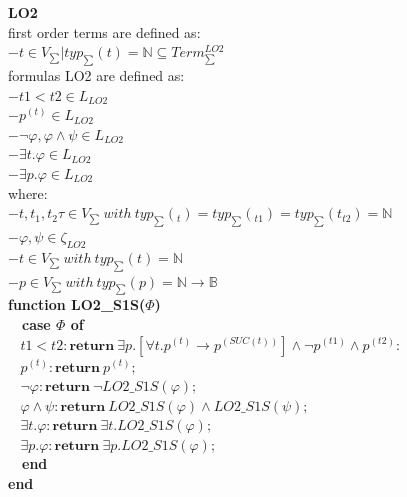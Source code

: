 \documentclass{article}
\begin{document}
\begin{multicols}{4}
\textbf{LO2} \\
first order terms are defined as: \\
$-{\textit{t} \in V_{\sum} | typ_{\sum}(\textit{t}) = \mathbb{N}} \subseteq Term _{\sum}^{LO2} $ \\
formulas LO2 are defined as: \\
$-t1 < t2 \in L_{LO2} $ \\
$-p^{(t)} \in L_{LO2}$ \\
$-\neg\varphi, \varphi \wedge \psi \in L_{LO2}$ \\
$-\exists t. \varphi \in L_{LO2} $ \\
$-\exists p. \varphi \in L_{LO2} $ \\
where: \\
$-t, t_{1}, t_{2}\tau \in V_{\sum} \ with \ typ_{\sum}(_{t}) = typ_{\sum}(_{t1}) = typ_{\sum}(t_{t2}) = \mathbb{N} $ \\
$-\varphi, \psi \in \zeta_{LO2} $ \\
$-t \in V_{\sum} \ with \ typ_{\sum}(t) = \mathbb{N}$ \\
$-p \in V_{\sum} \ with \ typ_{\sum}(p) = \mathbb{N} \rightarrow \mathbb{B}$ \\


\textbf{function LO2\_S1S($\Phi$)} \\
\ \ \textbf{case $\Phi$ of} \\
$\ \ \ \ t1 < t2 : \textbf{return}\ \exists p. [\forall t. p^{(t)} \rightarrow p^{(SUC(t))} ] \wedge \neg p^{(t1)} \wedge p^{(t2)}:$ \\
$\ \ \ \ p^{(t)} : \textbf{return}\ p^{(t)}; $ \\
$\ \ \ \ \neg \varphi : \textbf{return}\ \neg LO2\_S1S(\varphi); $ \\
$\ \ \ \ \varphi \wedge \psi : \textbf{return}\ LO2\_S1S(\varphi) \wedge LO2\_S1S(\psi); $ \\
$\ \ \ \ \exists t.\varphi : \textbf{return}\ \exists t.LO2\_S1S(\varphi);$ \\
$\ \ \ \ \exists p.\varphi : \textbf{return}\ \exists p.LO2\_S1S(\varphi); $ \\
\ \ \textbf{end} \\
\textbf{end} \\


\end{multicols}
\end{document}
